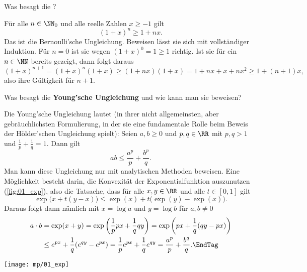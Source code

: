 \begin{frage}
  \label{q:bernoulli-ungleichung}
  Was besagt die ?
\end{frage}

\begin{antwort}
  Für alle $n\in \NN_0$ und 
  alle reelle Zahlen $x\ge -1$ gilt
  \[
  (1+x)^n \ge 1+nx.
  \]
  Das ist die Bernoulli'sche Ungleichung. 
  Beweisen lässt sie sich mit vollständiger Induktion. 
  Für $n=0$ ist sie wegen 
  $(1+x)^0 = 1 \ge 1$ richtig. Ist sie für ein $n\in\NN$ bereits gezeigt, 
  dann folgt daraus
  \[
  (1+x)^{n+1}=(1+x)^n(1+x) \ge (1+nx)(1+x) = 1+nx+x+nx^2 \ge 1+(n+1)x,
  \]
  also ihre Gültigkeit für $n+1$.
  \AntEnd
\end{antwort}






\begin{frage}
  Was besagt die 
  \textbf{Young'sche Ungleichung} und wie kann man sie beweisen?
\end{frage}

\begin{antwort}
  Die Young'sche Ungleichung lautet (in ihrer nicht allgemeinsten, 
  aber gebräuchlichsten Formulierung, in der sie eine fundamentale Rolle 
  beim Beweis der Hölder'schen Ungleichung spielt): 
  Seien $a,b \ge 0$ und $p,q\in\RR$ mit $p,q>1$ 
  und $\frac{1}{p}+\frac{1}{q}=1$. Dann gilt
  \[
  a b \le \frac{a^p}{p}+ \frac{b^p}{q}.
  \]
  Man kann diese Ungleichung nur mit analytischen Methoden beweisen.  
  Eine Möglichkeit besteht darin, die Konvexität der Exponentialfunktion 
  auszunutzen (\sieheAbbildung\ref{fig:01_exp}), 
  also die Tatsache, dass für alle $x,y \in \RR$ und alle $t\in [0,1]$ gilt 
  \[
  \exp\big( x+ t(y-x) \big) \le \exp(x) + t\big(\exp(y)-\exp(x)\big).
  \]
  Daraus folgt dann nämlich mit $x=\log a$ und $y=\log b$ für 
  $a,b \not=0$  
  \begin{align}
    a\cdot b &= \exp( x+ y ) = \exp \left(\frac{1}{p} px+\frac{1}{q}qy\right)
    = 
    \exp \left( px + \frac{1}{q} ( qy-px ) \right) \notag \\
    &\le
    e^{px} + \frac{1}{q} ( e^{qy} - e^{px} ) = 
    \frac{1}{p} e^{px} + \frac{1}{q} e^{qy} = \frac{a^p}{p}+\frac{b^q}{q}.\EndTag
  \end{align}

  \begin{center}
    \texttt{[image: mp/01\_exp]}
    \label{fig:01_exp}
  \end{center}

\end{antwort}

